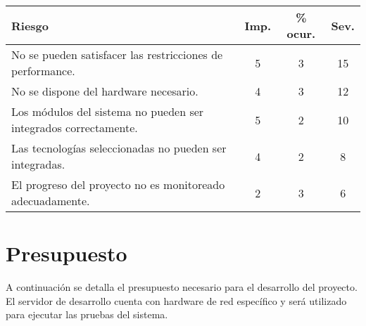 \begin{tabular}{|l||c|c|c|}

	\hline
	Riesgo & Imp. & \% ocur. & Sev. \\
	\hline
	No se pueden satisfacer las restricciones de performance.  & 5 & 3 & 15 \\
	No se dispone del hardware necesario. & 4 & 3 & 12 \\
	Los módulos del sistema no pueden ser integrados correctamente. & 5 & 2 & 10 \\
	Las tecnologías seleccionadas no pueden ser integradas. & 4 & 2 & 8 \\
	El progreso del proyecto no es monitoreado adecuadamente. & 2 & 3 & 6 \\
	\hline
	
\end{tabular}


\section*{Presupuesto}

A continuación se detalla el presupuesto necesario para el desarrollo del proyecto. El servidor de desarrollo cuenta con hardware de red específico y será utilizado para ejecutar las pruebas del sistema.


